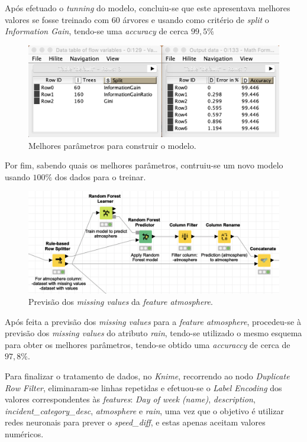 \documentclass[a4paper, 12pt]{article}
\begin{document}
Após efetuado o \textit{tunning} do modelo, concluiu-se que este apresentava melhores valores se fosse treinado com $60$ árvores e usando como critério de \textit{split} o \textit{Information Gain}, tendo-se uma \textit{accuracy} de cerca $99,5\%$

\begin{figure}[H]
	\centering
	\includegraphics[width=15cm]{melhores_params}
	\caption{Melhores parâmetros para construir o modelo.}
\end{figure}

Por fim, sabendo quais os melhores parâmetros, contruiu-se um novo modelo usando $100\%$ dos dados para o treinar.

\begin{figure}[H]
	\centering
	\includegraphics[width=15cm]{atmos}
	\caption{Previsão dos \textit{missing values} da \textit{feature atmosphere}.}
\end{figure}

Após feita a previsão dos \textit{missing values} para a \textit{feature atmosphere}, procedeu-se à previsão dos \textit{missing values} do atributo \textit{rain}, tendo-se utilizado o mesmo esquema para obter os melhores parâmetros, tendo-se obtido uma \textit{accuraccy} de cerca de $97,8\%$.

Para finalizar o tratamento de dados, no \textit{Knime}, recorrendo ao nodo \textit{Duplicate Row Filter}, eliminaram-se linhas repetidas e efetuou-se o \textit{Label Encoding} dos valores correspondentes às \textit{features}: \textit{Day of week (name)}, \textit{description}, \textit{incident\_category\_desc}, \textit{atmosphere} e \textit{rain}, uma vez que o objetivo é utilizar redes neuronais para prever o \textit{speed\_diff}, e estas apenas aceitam valores numéricos.
\end{document}
